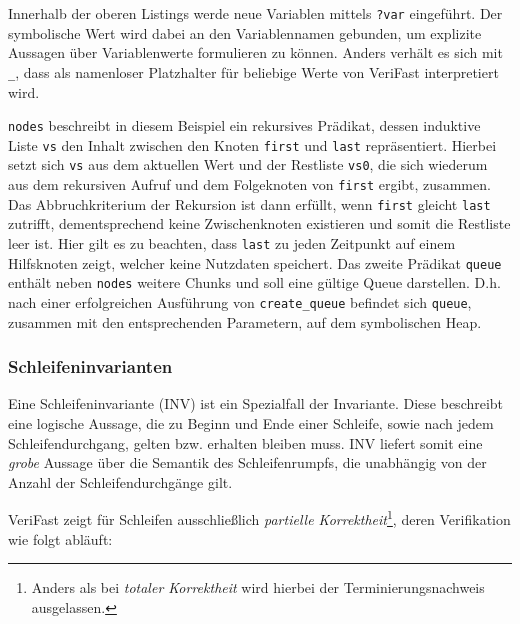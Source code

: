\noindent
Innerhalb der oberen Listings werde neue Variablen mittels \texttt{?var} eingeführt. Der symbolische Wert wird dabei an den Variablennamen gebunden, um explizite Aussagen über Variablenwerte formulieren zu können. Anders verhält es sich mit \texttt{\_}, dass als namenloser Platzhalter für beliebige Werte von VeriFast interpretiert wird. \cite{Jacobs2017}

\texttt{nodes} beschreibt in diesem Beispiel ein rekursives Prädikat, dessen induktive Liste \texttt{vs} den Inhalt zwischen den Knoten \texttt{first} und \texttt{last} repräsentiert. Hierbei setzt sich \texttt{vs} aus dem aktuellen Wert und der Restliste \texttt{vs0}, die sich wiederum aus dem rekursiven Aufruf und dem Folgeknoten von \texttt{first} ergibt, zusammen. Das Abbruchkriterium der Rekursion ist dann erfüllt, wenn \texttt{first} gleicht \texttt{last} zutrifft, dementsprechend keine Zwischenknoten existieren und somit die Restliste leer ist. Hier gilt es zu beachten, dass \texttt{last} zu jeden Zeitpunkt auf einem Hilfsknoten zeigt, welcher keine Nutzdaten speichert. Das zweite Prädikat \texttt{queue} enthält neben \texttt{nodes} weitere Chunks und soll eine gültige Queue darstellen. D.h. nach einer erfolgreichen Ausführung von \texttt{create\_queue} befindet sich \texttt{queue}, zusammen mit den entsprechenden Parametern, auf dem symbolischen Heap.

\subsubsection{Schleifeninvarianten}

Eine Schleifeninvariante (INV) ist ein Spezialfall der Invariante. Diese beschreibt eine logische Aussage, die zu Beginn und Ende einer Schleife, sowie nach jedem Schleifendurchgang, gelten bzw. erhalten bleiben muss. INV liefert somit eine \emph{grobe} Aussage über die Semantik des Schleifenrumpfs, die unabhängig von der Anzahl der Schleifendurchgänge gilt.

VeriFast zeigt für Schleifen ausschließlich \emph{partielle Korrektheit}\footnote{Anders als bei \emph{totaler Korrektheit} wird hierbei der Terminierungsnachweis ausgelassen.}, deren Verifikation wie folgt abläuft: \cite{Jacobs2017}

